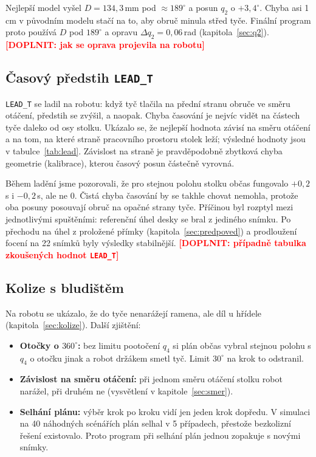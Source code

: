 \documentclass[11pt,a4paper]{article}
\newcommand{\doplnit}[1]{\textcolor{red}{\textbf{[DOPLNIT: #1]}}}
\begin{document}
Nejlepší model vyšel $D = 134{,}3$\,mm pod $\approx 189^\circ$ a posun $q_2$ o $+3{,}4^\circ$.
Chyba asi 1\,cm v původním modelu stačí na to, aby obruč minula střed tyče. Finální program
proto používá $D$ pod $189^\circ$ a opravu $\Delta q_2 = 0{,}06$\,rad (kapitola~\ref{sec:q2}).
\doplnit{jak se oprava projevila na robotu}

\subsection{Časový předstih \texttt{LEAD\_T}}
\label{sec:exp-lead}

\texttt{LEAD\_T} se ladil na robotu: když tyč tlačila na přední stranu obruče ve směru otáčení,
předstih se zvýšil, a naopak. Chyba časování je nejvíc vidět na částech tyče daleko od osy
stolku. Ukázalo se, že nejlepší hodnota závisí na směru otáčení a na tom, na které straně
pracovního prostoru stolek leží; výsledné hodnoty jsou v tabulce~\ref{tab:lead}. Závislost na
straně je pravděpodobně zbytková chyba geometrie (kalibrace), kterou časový posun částečně
vyrovná.

Během ladění jsme pozorovali, že pro stejnou polohu stolku občas fungovalo $+0{,}2$\,s
i $-0{,}2$\,s, ale ne 0. Čistá chyba časování by se takhle chovat nemohla, protože oba posuny
posouvají obruč na opačné strany tyče. Příčinou byl rozptyl mezi jednotlivými spuštěními:
referenční úhel desky se bral z jediného snímku. Po přechodu na úhel z proložené přímky
(kapitola~\ref{sec:predpoved}) a prodloužení focení na 22 snímků byly výsledky stabilnější.
\doplnit{případně tabulka zkoušených hodnot \texttt{LEAD\_T}}

\subsection{Kolize s bludištěm}

Na robotu se ukázalo, že do tyče nenarážejí ramena, ale díl u hřídele (kapitola~\ref{sec:kolize}).
Další zjištění:
\begin{itemize}
  \item \textbf{Otočky o $360^\circ$:} bez limitu pootočení $q_4$ si plán občas vybral stejnou
        polohu s $q_4$ o otočku jinak a robot držákem smetl tyč. Limit $30^\circ$ na krok to
        odstranil.
  \item \textbf{Závislost na směru otáčení:} při jednom směru otáčení stolku robot narážel, při
        druhém ne (vysvětlení v kapitole~\ref{sec:smer}).
  \item \textbf{Selhání plánu:} výběr krok po kroku vidí jen jeden krok dopředu. V simulaci na
        40 náhodných scénářích plán selhal v 5 případech, přestože bezkolizní řešení
        existovalo. Proto program při selhání plán jednou zopakuje s novými snímky.
\end{itemize}
\end{document}

